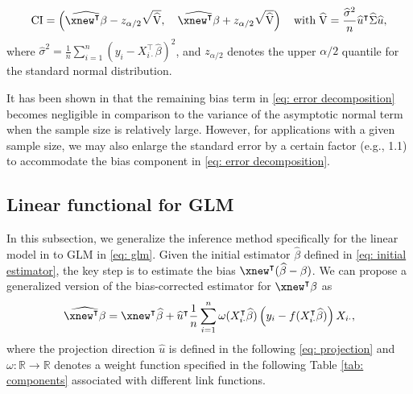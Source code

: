 \begin{equation*}
    \mathrm{CI}=\left(\widehat{\xnew^{\intercal}\beta}-z_{\alpha / 2} \sqrt{\widehat{\mathrm{V}}}, \quad \widehat{\xnew^{\intercal}\beta}+z_{\alpha / 2} \sqrt{\widehat{\mathrm{V}}}\right) \quad \textrm{with}\; \widehat{\mathrm{V}} = \frac{\widehat{\sigma}^2}{n} \widehat{u}^\intercal \widehat{\Sigma} \widehat{u},
\end{equation*}
where $\widehat{\sigma}^2 = \frac{1}{n}\sum_{i=1}^n (y_i - X_{i\cdot}^\intercal \widehat{\beta})^2$, and $z_{\alpha/2}$ denotes the upper $\alpha/2$ quantile for the standard normal distribution.
\begin{Remark}
It has been shown in \citet{cai2021optimal} that the remaining bias term in \eqref{eq: error decomposition} becomes negligible in comparison to the variance of the asymptotic normal term when the sample size is relatively large. However, for applications with a given sample size, we may also enlarge the standard error by a certain factor (e.g., 1.1) to accommodate the bias component in \eqref{eq: error decomposition}.
\label{rem: enlarging factor}
\end{Remark}


\subsection{Linear functional for GLM}
\label{subsec: LF-unified}
In this subsection, we generalize the inference method specifically for the linear model in  to GLM in \eqref{eq: glm}. Given the initial estimator $\widehat{\beta}$ defined in \eqref{eq: initial estimator}, the key step is to estimate the bias $\xnew^\intercal (\widehat{\beta} - \beta)$. 
We can propose a generalized version of the bias-corrected estimator for $\xnew^\intercal \beta$ as
\begin{equation}
    \widehat{\xnew^\intercal \beta} = \xnew^\intercal \widehat{\beta} +
    \widehat{u}^\intercal \frac{1}{n} \sum_{i=1}^n \omega(X_{i\cdot}^\intercal \widehat{\beta}) \left(y_i - f(X_{i\cdot}^\intercal \widehat{\beta})\right) X_{i\cdot},
    \label{eq: LF point estimator - unified}
\end{equation}
where the projection direction $\widehat{u}$ is defined in the following \eqref{eq: projection} and $\omega: \mathbb{R} \to \mathbb{R}$ denotes a weight function specified in the following Table \ref{tab: components} associated with different link functions.

